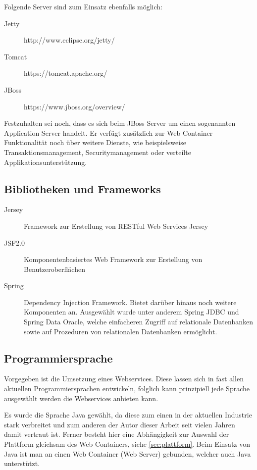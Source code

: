 Folgende Server sind zum Einsatz ebenfalls möglich:

\begin{description}
\item[Jetty] http://www.eclipse.org/jetty/
\item[Tomcat] https://tomcat.apache.org/
\item[JBoss] https://www.jboss.org/overview/
\end{description}

Festzuhalten sei noch, dass es sich beim JBoss Server um einen sogenannten Application Server handelt. Er verfügt zusätzlich zur Web Container Funktionalität noch über weitere Dienste, wie beispielsweise Transaktionsmanagement, Securitymanagement oder verteilte Applikationsunterstützung. 

\subsection{Bibliotheken und Frameworks} \label{sec:bibliotheken_und_frameworks}
\begin{description}

\item[Jersey] Framework zur Erstellung von RESTful Web Services \gls{Jersey}
\item[JSF2.0] Komponentenbasiertes Web Framework zur Erstellung von Benutzeroberflächen 
\item[Spring] Dependency Injection Framework. Bietet darüber hinaus noch weitere Komponenten an. Ausgewählt wurde unter anderem \gls{Spring} JDBC und \gls{Spring} Data Oracle, welche einfacheren Zugriff auf relationale Datenbanken sowie auf Prozeduren von relationalen Datenbanken ermöglicht.  
    
\end{description}

\subsection{Programmiersprache}
Vorgegeben ist die Umsetzung eines \glspl{Webservice}. Diese lassen sich in fast allen aktuellen Programmiersprachen entwickeln, folglich kann prinzipiell jede Sprache ausgewählt werden die Webservices anbieten kann.  

Es wurde die Sprache Java gewählt, da diese zum einen in der aktuellen Industrie stark verbreitet und zum anderen der Autor dieser Arbeit seit vielen Jahren damit vertraut ist. Ferner besteht hier eine Abhängigkeit zur Auswahl der Plattform gleichsam des Web Containers, siehe \autoref{sec:plattform}. Beim Einsatz von Java ist man an einen Web Container (Web Server) gebunden, welcher auch Java unterstützt. 

